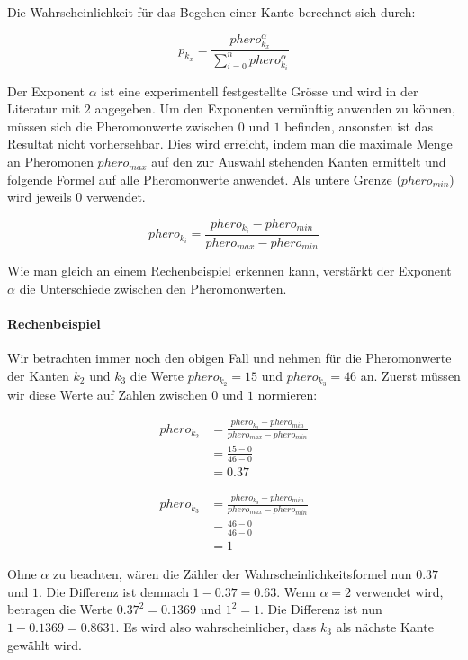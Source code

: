 Die Wahrscheinlichkeit für das Begehen einer Kante berechnet sich durch:

\[ p_{k_x} = \frac{phero_{k_x}^\alpha}{\sum\nolimits_{i=0}^n phero_{k_i}^\alpha} \]

\noindent
Der Exponent $\alpha$ ist eine experimentell festgestellte Grösse und wird in der Literatur mit $2$ angegeben. Um den Exponenten vernünftig anwenden zu können, müssen sich die Pheromonwerte zwischen $0$ und $1$ befinden, ansonsten ist das Resultat nicht vorhersehbar. Dies wird erreicht, indem man die maximale Menge an Pheromonen $phero_{max}$ auf den zur Auswahl stehenden Kanten ermittelt und folgende Formel auf alle Pheromonwerte anwendet. Als untere Grenze ($phero_{min}$) wird jeweils $0$ verwendet.

\[ phero_{k_i} = \frac{phero_{k_i} - phero_{min}}{phero_{max} - phero_{min}} \] 

\noindent
Wie man gleich an einem Rechenbeispiel erkennen kann, verstärkt der Exponent $\alpha$ die Unterschiede zwischen den Pheromonwerten.

\paragraph*{Rechenbeispiel}

Wir betrachten immer noch den obigen Fall und nehmen für die Pheromonwerte der Kanten $k_2$ und $k_3$ die Werte $phero_{k_2} = 15 $ und $phero_{k_3} = 46$ an. Zuerst müssen wir diese Werte auf Zahlen zwischen $0$ und $1$ normieren:

\begin{equation*}
\begin{split}
phero_{k_2} & = \frac{phero_{k_2} - phero_{min}}{phero_{max} - phero_{min}} \\
            & = \frac{15 - 0}{46 - 0} \\
            & = 0.37
\end{split}
\end{equation*}

\begin{equation*}
\begin{split}
phero_{k_3} & = \frac{phero_{k_3} - phero_{min}}{phero_{max} - phero_{min}} \\
            & = \frac{46 - 0}{46 - 0} \\
            & = 1
\end{split}
\end{equation*}

\noindent
Ohne $\alpha$ zu beachten, wären die Zähler der Wahrscheinlichkeitsformel nun $0.37$ und $1$. Die Differenz ist demnach $1 - 0.37 = 0.63$. Wenn $\alpha = 2$ verwendet wird, betragen die Werte $0.37^2 = 0.1369$ und $1^2 = 1$. Die Differenz ist nun $1 - 0.1369 = 0.8631$. Es wird also wahrscheinlicher, dass $k_3$ als nächste Kante gewählt wird.

